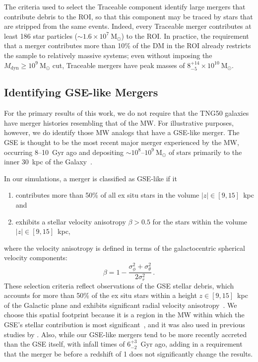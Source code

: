 \documentclass[twocolumn,tighten,twocolappendix]{aastex701}
\newcommand{\Msun}{\ensuremath{\mathrm{M}_\odot}}
\newcommand{\Mdyn}{\ensuremath{M_\mathrm{dyn}}}
\newcommand{\osim}{\mathord{\sim}}
\begin{document}
The criteria used to select the Traceable component identify large mergers that contribute debris to the ROI, so that this component may be traced by stars that are stripped from the same events. Indeed, every Traceable merger contributes at least 186 star particles ($\osim 1.6\times 10^7~\Msun$) to the ROI. In practice, the requirement that a merger contributes more than 10\% of the DM in the ROI already restricts the sample to relatively massive systems; even without imposing the $\Mdyn\geq10^9~\Msun$ cut, Traceable mergers have peak masses of $8^{+14}_{-5}\times10^{10}~\Msun$. 


\subsection{Identifying GSE-like Mergers}

For the primary results of this work, we do not require that the TNG50 galaxies have merger histories resembling that of the MW. For illustrative purposes, however, we do identify those MW analogs that have a GSE-like merger. The GSE is thought to be the most recent major merger experienced by the MW, occurring 8--10~Gyr ago and depositing $\osim10^{8}$--$10^{9}~\Msun$ of stars primarily to the inner 30~kpc of the Galaxy~\citep{2018ApJ...862L...1D, 2018Natur.563...85H,2018ApJ...856L..26M, 2019NatAs...3..932G, 2019MNRAS.486..378L, 2019ApJ...874....3N, 2020ApJ...897L..18B,2021MNRAS.508.1489F, 2021MNRAS.502.5686I,2021NatAs...5..640M, 
 2021ApJ...923...92N}.

In our simulations, a merger is classified as GSE-like if it 
\begin{enumerate}
    \item contributes more than 50\% of all ex situ stars in the volume $|z|\in[9,15]$~kpc and
    \item exhibits a stellar velocity anisotropy $\beta>0.5$ for the stars within the volume $|z|\in[9,15]$~kpc,
\end{enumerate}
where the velocity anisotropy is defined in terms of the galactocentric spherical velocity components:
\begin{equation}
    \beta=1-\frac{\sigma_\phi^2+\sigma_\theta^2}{2\sigma_r^2} \, . 
\end{equation}
These selection criteria reflect observations of the GSE stellar debris, which accounts for more than 50\% of the ex situ stars within a height $z\in[9,15]$~kpc of the Galactic plane and exhibits significant radial velocity anisotropy~\citep{2018ApJ...862L...1D, 2018ApJ...856L..26M, 2019MNRAS.486..378L, 2019ApJ...874....3N, 2021MNRAS.502.5686I, 2021ApJ...923...92N}. We choose this spatial footprint because it is a region in the MW within which the GSE's stellar contribution is most significant~\citep{2020ApJ...901...48N}, and it was also used in previous studies by \citet{2019MNRAS.484.4471F}. Also, while our GSE-like mergers tend to be more recently accreted than the GSE itself, with infall times of $6^{+3}_{-2}$~Gyr ago, adding in a requirement that the merger be before a redshift of 1 does not significantly change the results.
\end{document}
